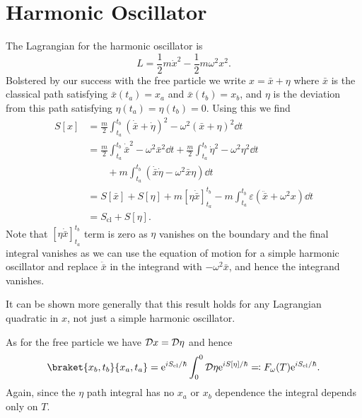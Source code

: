 \documentclass[fleqn]{NotesClass}
\newcommand*{\e}{\mathrm{e}}
\newcommand*{\lagrangian}{L}
\newcommand*{\cl}{\mathrm{cl}}
\begin{document}
    \section{Harmonic Oscillator}
    The Lagrangian for the harmonic oscillator is
    \begin{equation}
        \lagrangian = \frac{1}{2}m\dot{x}^2 - \frac{1}{2}m\omega^2x^2.
    \end{equation}
    Bolstered by our success with the free particle we write \(x = \bar{x} + \eta\) where \(\bar{x}\) is the classical path satisfying \(\bar{x}(t_a) = x_a\) and \(\bar{x}(t_b) = x_b\), and \(\eta\) is the deviation from this path satisfying \(\eta(t_a) = \eta(t_b) = 0\).
    Using this we find
    \begin{align}
        S[x] &= \frac{m}{2}\int_{t_a}^{t_b} (\dot{\bar{x}} + \dot{\eta})^2 - \omega^2(\bar{x} + \eta)^2\dd{t}\\
        &= \frac{m}{2}\int_{t_a}^{t_b} \dot{\bar{x}}^2 - \omega^2 \bar{x}^2 \dd{t} + \frac{m}{2}\int_{t_a}^{t_b} \dot{\eta}^2- \omega^2\eta^2 \dd{t}\\
        &\qquad+ m\int_{t_a}^{t_b} (\dot{\bar{x}}\dot{\eta} - \omega^2\bar{x}\eta) \dd{t}\\
        &= S[\bar{x}] + S[\eta] + m[\eta\dot{\bar{x}}]_{t_a}^{t_b} - m\int_{t_a}^{t_b} \varepsilon(\ddot{\bar{x}} + \omega^2 x) \dd{t}\\
        &= S_{\cl} + S[\eta].
    \end{align}
    Note that \([\eta\dot{\bar{x}}]_{t_a}^{t_b}\) term is zero as \(\eta\) vanishes on the boundary and the final integral vanishes as we can use the equation of motion for a simple harmonic oscillator and replace \(\ddot{\bar{x}}\) in the integrand with \(-\omega^2\bar{x}\), and hence the integrand vanishes.
    
    It can be shown more generally that this result holds for any Lagrangian quadratic in \(x\), not just a simple harmonic oscillator.
    
    As for the free particle we have \(\DL{x} = \DL{\eta}\) and hence
    \begin{equation}
        \braket{x_b, t_b}{x_a, t_a} = \e^{iS_{\cl}/\hbar} \int_0^0 \DL{\eta} \e^{iS[\eta]/\hbar} \eqqcolon F_{\omega}(T)\e^{iS_{\cl}/\hbar}.
    \end{equation}
    Again, since the \(\eta\) path integral has no \(x_a\) or \(x_b\) dependence the integral depends only on \(T\).
    
\end{document}
